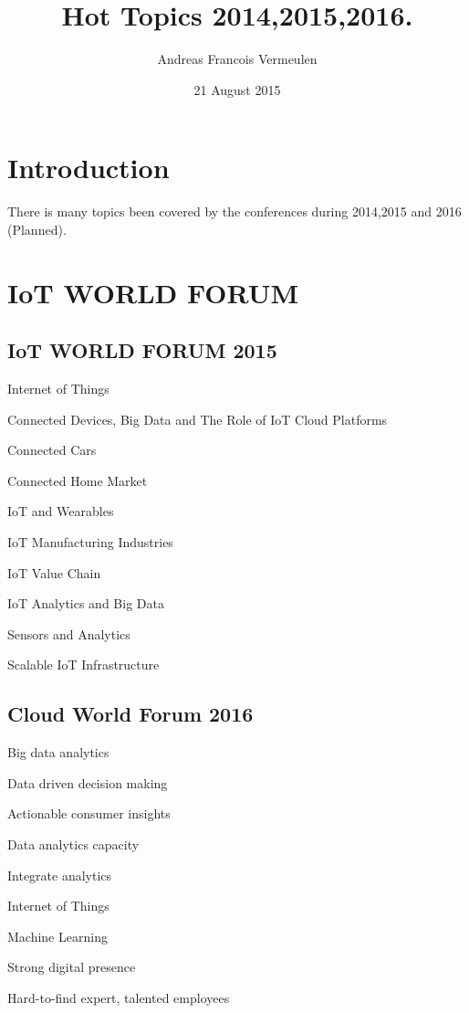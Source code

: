 \documentclass{report}
\begin{document}
\title{Hot Topics 2014,2015,2016.}
\author{Andreas Francois Vermeulen}
\date{21 August 2015}

\maketitle

\section{Introduction}

There is many topics been covered by the conferences during 2014,2015 and 2016 (Planned).

\section{IoT WORLD FORUM}
\subsection{IoT WORLD FORUM 2015}

Internet of Things

Connected Devices, Big Data and The Role of IoT Cloud Platforms 

Connected Cars

Connected Home Market

IoT and Wearables

IoT Manufacturing Industries

IoT Value Chain

IoT Analytics and Big Data

Sensors and Analytics

Scalable IoT Infrastructure

\subsection{Cloud World Forum 2016}

Big data analytics

Data driven decision making

Actionable consumer insights

Data analytics capacity

Integrate analytics

Internet of Things

Machine Learning

Strong digital presence

Hard-to-find expert, talented employees
\end{document}
